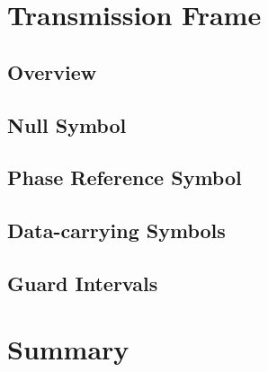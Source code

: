 \documentclass[class=report,11pt,crop=false]{standalone}
\begin{document}
\section{Transmission Frame}


\subsection{Overview}


\subsection{Null Symbol}


\subsection{Phase Reference Symbol}


\subsection{Data-carrying Symbols}


\subsection{Guard Intervals}



\section{Summary}


\ifstandalone

\printnoidxglossary[type=\acronymtype,nonumberlist]
\fi
\end{document}
